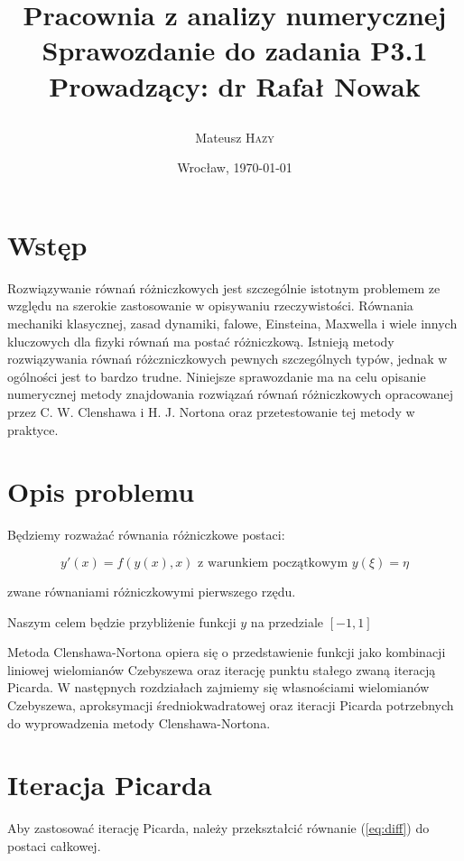 \documentclass{article}
\title{\LARGE\textbf{Pracownia z analizy numerycznej} \\ Sprawozdanie do zadania \textbf{P3.1} \\
\vskip 0.2cm \large Prowadzący: dr Rafał Nowak\\
\author{Mateusz \textsc{Hazy}}}
\date{Wrocław, \today}
\begin{document}
\maketitle


\section{Wstęp}

\par Rozwiązywanie równań różniczkowych jest szczególnie istotnym problemem ze względu na szerokie zastosowanie w opisywaniu rzeczywistości. Równania mechaniki klasycznej, zasad dynamiki, falowe, Einsteina, Maxwella i wiele innych kluczowych dla fizyki równań ma postać różniczkową. Istnieją metody rozwiązywania równań różczniczkowych pewnych szczególnych typów, jednak w ogólności jest to bardzo trudne. Niniejsze sprawozdanie ma na celu opisanie numerycznej metody znajdowania rozwiązań równań różniczkowych opracowanej przez C. W. Clenshawa i H. J. Nortona oraz przetestowanie tej metody w praktyce.

\section{Opis problemu}

Będziemy rozważać równania różniczkowe postaci:

\begin{equation}
	\label{eq:diff}
	y'(x) = f(y(x), x) \text{ z warunkiem początkowym } y(\xi) = \eta 
\end{equation}

zwane równaniami różniczkowymi pierwszego rzędu.

\par Naszym celem będzie przybliżenie funkcji $y$ na przedziale $[-1, 1]$

\par Metoda Clenshawa-Nortona opiera się o przedstawienie funkcji jako kombinacji liniowej wielomianów Czebyszewa oraz iterację punktu stałego zwaną iteracją Picarda. W następnych rozdziałach zajmiemy się własnościami wielomianów Czebyszewa, aproksymacji średniokwadratowej oraz iteracji Picarda potrzebnych do wyprowadzenia metody Clenshawa-Nortona.

\section{Iteracja Picarda}
	
	Aby zastosować iterację Picarda, należy przekształcić równanie (\ref{eq:diff}) do postaci całkowej. 
	
\end{document}
